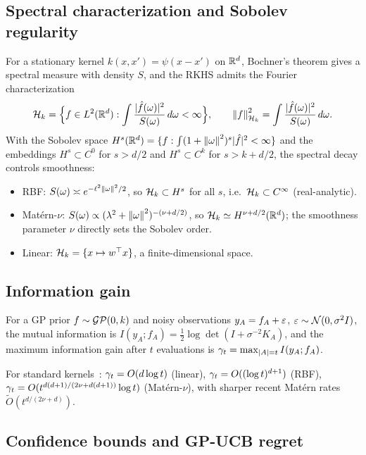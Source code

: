 \subsection{Spectral characterization and Sobolev regularity}

For a stationary kernel $k(x,x')=\psi(x-x')$ on $\mathbb{R}^d$, Bochner's theorem gives a
spectral measure with density $S$, and the RKHS admits the Fourier
characterization~\cite{kanagawa2018}
\[
\mathcal{H}_k=\Bigl\{f\in L^2(\mathbb{R}^d):\int\frac{|\hat f(\omega)|^2}{S(\omega)}\,d\omega<\infty\Bigr\},
\qquad \left\lVert f\right\rVert_{\mathcal{H}_k}^2=\int\frac{|\hat f(\omega)|^2}{S(\omega)}\,d\omega .
\]
With the Sobolev space $H^s(\mathbb{R}^d)=\{f:\int(1+\left\lVert \omega\right\rVert^2)^s|\hat f|^2<\infty\}$
and the embeddings $H^s\subset C^0$ for $s>d/2$ and $H^s\subset C^k$ for
$s>k+d/2$, the spectral decay controls smoothness:
\begin{itemize}
  \item RBF: $S(\omega)\asymp e^{-\ell^2\left\lVert \omega\right\rVert^2/2}$, so $\mathcal{H}_k\subset H^s$
        for all $s$, i.e.\ $\mathcal{H}_k\subset C^\infty$ (real-analytic).
  \item Mat\'ern-$\nu$: $S(\omega)\propto(\lambda^2+\left\lVert \omega\right\rVert^2)^{-(\nu+d/2)}$,
        so $\mathcal{H}_k\simeq H^{\nu+d/2}(\mathbb{R}^d)$; the smoothness parameter $\nu$ directly
        sets the Sobolev order.
  \item Linear: $\mathcal{H}_k=\{x\mapsto w^\top x\}$, a finite-dimensional space.
\end{itemize}

\subsection{Information gain}

\begin{definition}
For a GP prior $f\sim\mathcal{GP}(0,k)$ and noisy observations $y_A=f_A+\varepsilon$,
$\varepsilon\sim\mathcal N(0,\sigma^2 I)$, the mutual information is
$I(y_A;f_A)=\tfrac12\log\det(I+\sigma^{-2}K_A)$, and the maximum information gain
after $t$ evaluations is $\gamma_t=\max_{|A|=t}I(y_A;f_A)$.
\end{definition}

For standard kernels~\cite{srinivas2010}: $\gamma_t=O(d\log t)$ (linear),
$\gamma_t=O((\log t)^{d+1})$ (RBF),
$\gamma_t=O(t^{d(d+1)/(2\nu+d(d+1))}\log t)$ (Mat\'ern-$\nu$), with sharper recent
Mat\'ern rates $\widetilde O(t^{d/(2\nu+d)})$.

\subsection{Confidence bounds and GP-UCB regret}

